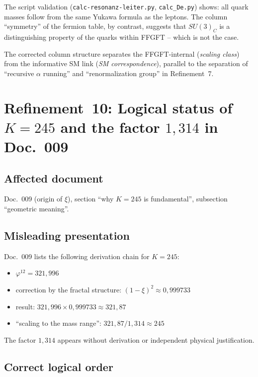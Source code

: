 The script validation (\texttt{calc-resonanz-leiter.py}, \texttt{calc\_De.py})
shows: all quark masses follow from the same Yukawa formula as the leptons. The
column \enquote{symmetry} of the fermion table, by contrast, suggests that
$SU(3)_C$ is a distinguishing property of the quarks within FFGFT -- which is
not the case.

The corrected column structure separates the FFGFT-internal
(\emph{scaling class}) from the informative SM link (\emph{SM correspondence}),
parallel to the separation of \enquote{recursive $\alpha$ running} and
\enquote{renormalization group} in Refinement~7.

\section{\texorpdfstring{Refinement~10: Logical status of $K = 245$ and the factor $1{,}314$ in Doc.~009}{Refinement 10: Logical status of K = 245 and the factor 1.314 in Doc. 009}}

\subsection*{Affected document}

Doc.~009 (origin of $\xi$), section \enquote{why $K = 245$ is fundamental},
subsection \enquote{geometric meaning}.

\subsection*{Misleading presentation}

Doc.~009 lists the following derivation chain for $K = 245$:
\begin{itemize}
  \item $\varphi^{12} = 321{,}996$
  \item correction by the fractal structure: $(1-\xi)^2 \approx 0{,}999733$
  \item result: $321{,}996 \times 0{,}999733 \approx 321{,}87$
  \item \enquote{scaling to the mass range}: $321{,}87 / 1{,}314 \approx 245$
\end{itemize}
The factor $1{,}314$ appears without derivation or independent physical
justification.

\subsection*{Correct logical order}

